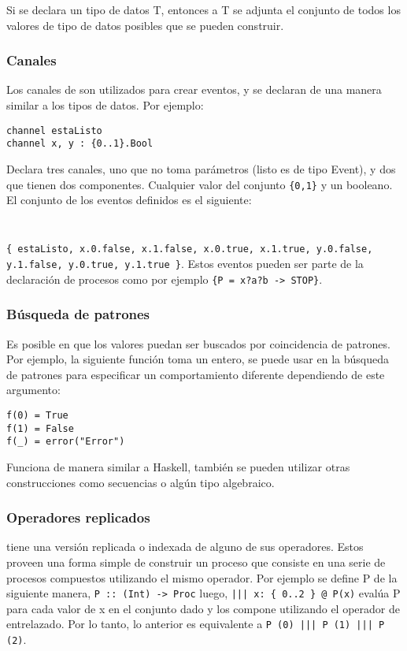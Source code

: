 Si se declara un tipo de datos T, entonces a T se adjunta el conjunto de todos los valores de tipo de datos posibles que se pueden construir. 

\subsubsection{Canales}

Los canales de \CSPm son utilizados para crear eventos, y se declaran de una manera similar a los tipos de datos. Por ejemplo:

\begin{verbatim}
channel estaListo
channel x, y : {0..1}.Bool
\end{verbatim}

Declara tres canales, uno que no toma parámetros (listo es de tipo Event), y dos que tienen dos componentes. Cualquier valor del conjunto \verb={0,1}= y un booleano. El conjunto de los eventos definidos es el siguiente: 
\begin{verbatim}
	
\end{verbatim}
\verb={ estaListo, x.0.false, x.1.false, x.0.true, x.1.true, y.0.false, y.1.false, y.0.true, y.1.true }=. Estos eventos pueden ser parte de la declaración de procesos como por ejemplo \verb#{P = x?a?b -> STOP}#.

\subsubsection{Búsqueda de patrones}

Es posible en \CSP que los valores puedan ser buscados por coincidencia de patrones. Por ejemplo, la siguiente función toma un entero, se puede usar en la búsqueda de patrones para especificar un comportamiento diferente dependiendo de este argumento:

\begin{verbatim}
f(0) = True
f(1) = False
f(_) = error("Error")
\end{verbatim}

Funciona de manera similar a Haskell, también se pueden utilizar otras construcciones como secuencias o algún tipo algebraico.

\subsubsection{Operadores replicados}
\FDR tiene una versión replicada o indexada de alguno de sus operadores. Estos proveen una forma simple de construir un proceso que consiste en una serie de procesos compuestos utilizando el mismo operador. Por ejemplo se define P de la siguiente manera, \verb=P :: (Int) -> Proc= luego, \verb=||| x: { 0..2 } @ P(x)= evalúa P para cada valor de x en el conjunto dado y los compone utilizando el operador de entrelazado. Por lo tanto, lo anterior es equivalente a \verb=P (0) ||| P (1) ||| P (2)=.


